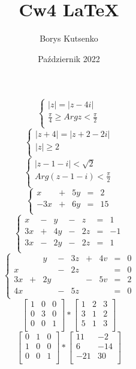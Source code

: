 \documentclass[12pt, letterpaper, titlepage]{article}
\title{Cw4 LaTeX}
\author{Borys Kutsenko}
\date{Październik 2022}
\begin{document}
$$ 
\begin{cases}
|z|= |z-4i| \\
\frac{\pi}{4} \geq Arg z < \frac{\pi}{2} \\
\end{cases} $$
$$ 
\begin{cases}
|z+4|= |z+2-2i| \\
|z| \geq 2 \\
\end{cases}$$
$$ 
\begin{cases}
|z-1-i|< \sqrt{2} \\
Arg(z-1-i)< \frac{\pi}{2} \\
\end{cases} $$
$$
\left\{
\begin{array}{rrrrr}
x&+&5y&=&2\\
-3x&+&6y&=&15\\
\end{array}
\right.$$
$$
\left\{
\begin{array}{rrrrrrr}
x&-&y&-&z&=&1\\
3x&+&4y&-&2z&=&-1\\
3x&-&2y&-&2z&=&1\\
\end{array}
\right.$$
$$
\left\{
\begin{array}{rrrrrrrrr}
&&y&-&3z&+&4v&=&0\\
x&&&-&2z&&&=&0\\
3x&+&2y&&&-&5v&=&2\\
4x&&&-&5z&&&=&0\\
\end{array}
\right.$$
$$\left[ \begin{array}{ccc}
1 & 0 & 0 \\
0 & 3 & 0 \\
0 & 0 & 1 \\
\end{array} \right] *
 \left[ \begin{array}{ccc}
1 & 2 & 3 \\
3 & 1 & 2 \\
5 & 1 & 3 \\
\end{array} \right]
$$
$$\left[ \begin{array}{ccc}
0 & 1 & 0 \\
1 & 0 & 0 \\
0 & 0 & 1 \\
\end{array} \right] *
 \left[ \begin{array}{cc}
11 & -2 \\
6 & -14  \\
-21 & 30  \\
\end{array} \right]
$$
\end{document}
